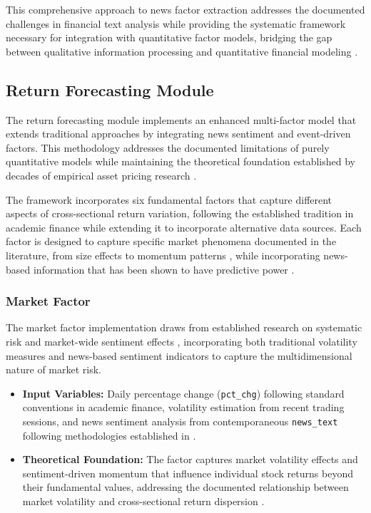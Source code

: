 \documentclass[3p,times,procedia]{elsarticle}
\begin{document}
This comprehensive approach to news factor extraction addresses the documented challenges in financial text analysis while providing the systematic framework necessary for integration with quantitative factor models, bridging the gap between qualitative information processing and quantitative financial modeling \cite{Harvey2016}.
\subsection{{Return Forecasting Module}}

The return forecasting module implements an enhanced multi-factor model that extends traditional approaches \cite{FAMA1993,Carhart1997} by integrating news sentiment and event-driven factors. This methodology addresses the documented limitations of purely quantitative models \cite{Harvey2016} while maintaining the theoretical foundation established by decades of empirical asset pricing research \cite{Banz1981,Rosenberg1985}.

The framework incorporates six fundamental factors that capture different aspects of cross-sectional return variation, following the established tradition in academic finance while extending it to incorporate alternative data sources. Each factor is designed to capture specific market phenomena documented in the literature, from size effects \cite{Banz1981} to momentum patterns \cite{Jegadeesh1993}, while incorporating news-based information that has been shown to have predictive power \cite{TETLOCK2007}.

\subsubsection{{Market Factor}}

The market factor implementation draws from established research on systematic risk and market-wide sentiment effects \cite{Fama1965,Campbell2001}, incorporating both traditional volatility measures and news-based sentiment indicators to capture the multidimensional nature of market risk.

\begin{itemize}
    \item \textbf{Input Variables:} Daily percentage change (\texttt{pct\_chg}) following standard conventions in academic finance, volatility estimation from recent trading sessions, and news sentiment analysis from contemporaneous \texttt{news\_text} following methodologies established in \cite{TETLOCK2007}.
    \item \textbf{Theoretical Foundation:} The factor captures market volatility effects and sentiment-driven momentum that influence individual stock returns beyond their fundamental values, addressing the documented relationship between market volatility and cross-sectional return dispersion \cite{Campbell2001}.
\end{itemize}
\end{document}
